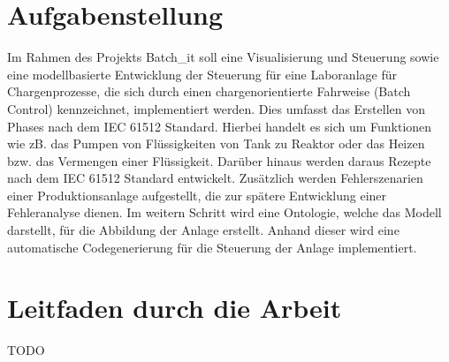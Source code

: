 
\section{Aufgabenstellung}
 Im Rahmen des Projekts Batch\_it soll eine Visualisierung und Steuerung sowie eine modellbasierte Entwicklung der Steuerung für eine Laboranlage für Chargenprozesse, die sich durch einen chargenorientierte Fahrweise (Batch Control) kennzeichnet,  implementiert werden. Dies umfasst das Erstellen von Phases nach dem IEC 61512 Standard. Hierbei handelt es sich um Funktionen wie zB. das Pumpen von Flüssigkeiten von Tank zu Reaktor oder das Heizen bzw. das Vermengen einer Flüssigkeit. Darüber hinaus werden daraus Rezepte nach dem IEC 61512 Standard entwickelt. Zusätzlich werden Fehlerszenarien einer Produktionsanlage aufgestellt, die zur spätere Entwicklung einer Fehleranalyse dienen. Im weitern Schritt wird eine Ontologie, welche das Modell darstellt, für die Abbildung der Anlage erstellt. Anhand dieser wird eine automatische Codegenerierung für die Steuerung der Anlage implementiert.

\section{Leitfaden durch die Arbeit}
TODO
